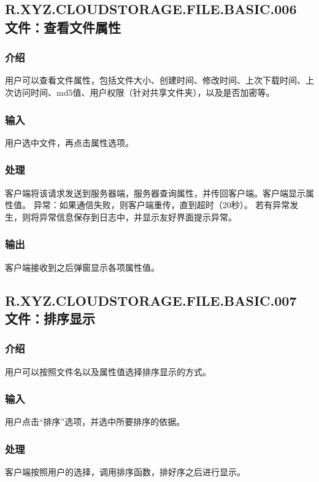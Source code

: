 \subsection{R.XYZ.CLOUDSTORAGE.FILE.BASIC.006 文件：查看文件属性}

\subsubsection{介绍} 
用户可以查看文件属性，包括文件大小、创建时间、修改时间、上次下载时间、上次访问时间、md5值、用户权限（针对共享文件夹），以及是否加密等。

\subsubsection{输入} 
用户选中文件，再点击属性选项。

\subsubsection{处理}
客户端将该请求发送到服务器端，服务器查询属性，并传回客户端。客户端显示属性值。
异常：如果通信失败，则客户端重传，直到超时（20秒）。
若有异常发生，则将异常信息保存到日志中，并显示友好界面提示异常。

\subsubsection{输出}
客户端接收到之后弹窗显示各项属性值。


\subsection{R.XYZ.CLOUDSTORAGE.FILE.BASIC.007 文件：排序显示}

\subsubsection{介绍} 
用户可以按照文件名以及属性值选择排序显示的方式。

\subsubsection{输入} 
用户点击“排序”选项，并选中所要排序的依据。

\subsubsection{处理}
客户端按照用户的选择，调用排序函数，排好序之后进行显示。

